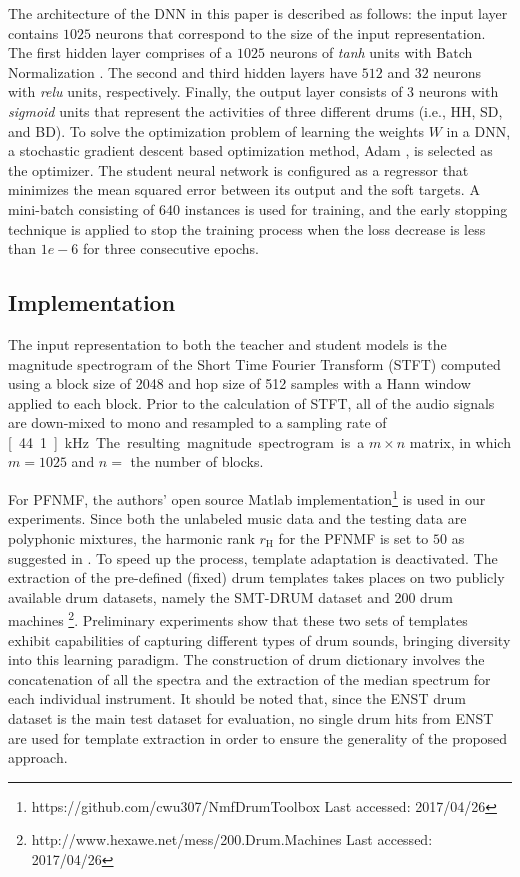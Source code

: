 \documentclass{article}
\begin{document}
The architecture of the DNN in this paper is described as follows: the input layer contains $1025$ neurons that correspond to the size of the input representation. The first hidden layer comprises of a $1025$ neurons of \textit{tanh} units with Batch Normalization \cite{Ioffe2015}. The second and third hidden layers have $512$ and $32$ neurons with \textit{relu} units, respectively. Finally, the output layer consists of 3 neurons with \textit{sigmoid} units that represent the activities of three different drums (i.e., HH, SD, and BD). To solve the optimization problem of learning the weights $W$ in a DNN, a stochastic gradient descent based optimization method, Adam \cite{Kingma2015}, is selected as the optimizer. The student neural network is configured as a regressor that minimizes the mean squared error between its output and the soft targets. A mini-batch consisting of $640$ instances is used for training, and the early stopping technique is applied to stop the training process when the loss decrease is less than $1e-6$ for three consecutive epochs. 

\subsection{Implementation}
The input representation to both the teacher and student models is the magnitude spectrogram of the Short Time Fourier Transform (STFT) computed using a block size of 2048 and hop size of 512 samples with a Hann window applied to each block. Prior to the calculation of STFT, all of the audio signals are down-mixed to mono and resampled to a sampling rate of \unit[44.1]{kHz}. The resulting magnitude spectrogram is a $m \times n$ matrix, in which $m = 1025$ and $n = $ the number of blocks. 

For PFNMF, the authors' open source Matlab implementation\footnote{https://github.com/cwu307/NmfDrumToolbox Last accessed: 2017/04/26} is used in our experiments. Since both the unlabeled music data and the testing data are polyphonic mixtures, the harmonic rank $r_\mathrm{H} $ for the PFNMF is set to $50$ as suggested in \cite{Wu2015a}. To speed up the process, template adaptation is deactivated. The extraction of the pre-defined (fixed) drum templates takes places on two publicly available drum datasets, namely the SMT-DRUM dataset \cite{Dittmar2014} and 200 drum machines \footnote{http://www.hexawe.net/mess/200.Drum.Machines Last accessed: 2017/04/26}. Preliminary experiments show that these two sets of templates exhibit capabilities of capturing different types of drum sounds, bringing diversity into this learning paradigm. The construction of drum dictionary involves the concatenation of all the spectra and the extraction of the median spectrum for each individual instrument. It should be noted that, since the ENST drum dataset is the main test dataset for evaluation, no single drum hits from ENST are used for template extraction in order to ensure the generality of the proposed approach.
\end{document}
